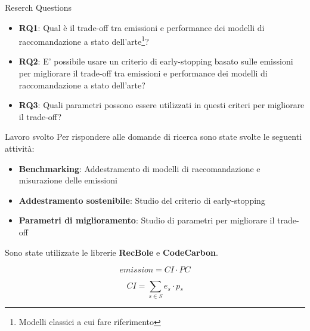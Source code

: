 \begin{frame}{Reserch Questions}
    \begin{itemize}
        \item \textbf{RQ1}: Qual è il trade-off tra emissioni e performance dei modelli di raccomandazione a stato dell'arte\footnote{Modelli classici a cui fare riferimento}{?}
        \item \textbf{RQ2}: E’ possibile usare un criterio di early-stopping basato sulle emissioni per migliorare il trade-off tra emissioni e performance dei modelli di raccomandazione a stato dell’arte?
        \item \textbf{RQ3}: Quali parametri possono essere utilizzati in questi criteri per migliorare il trade-off?
    \end{itemize}
\end{frame}

\begin{frame}{Lavoro svolto}
    Per rispondere alle domande di ricerca sono state svolte le seguenti attività:
    \begin{itemize}
        \item \textbf{Benchmarking}: Addestramento di modelli di raccomandazione e misurazione delle emissioni
        \item \textbf{Addestramento sostenibile}: Studio del criterio di early-stopping
        \item \textbf{Parametri di miglioramento}: Studio di parametri per migliorare il trade-off
    \end{itemize}
    Sono state utilizzate le librerie \textbf{RecBole} e \textbf{CodeCarbon}.

    \begin{equation*}
        \textit{emission} = \textit{CI}  \cdot \textit{PC}
    \end{equation*}
    
    \begin{equation*}
        \textit{CI} = \sum_{s \in S} \textit{e$_s$} \cdot \textit{p$_s$}
    \end{equation*}
    
\end{frame}